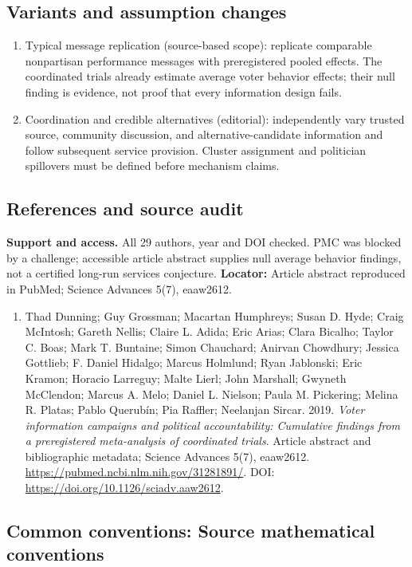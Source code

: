\documentclass[11pt,a4paper]{article}
\begin{document}
\subsection*{Variants and assumption changes}
\begin{enumerate}
\item Typical message replication (source-based scope): replicate comparable nonpartisan performance messages with preregistered pooled effects. The coordinated trials already estimate average voter behavior effects; their null finding is evidence, not proof that every information design fails.
\item Coordination and credible alternatives (editorial): independently vary trusted source, community discussion, and alternative-candidate information and follow subsequent service provision. Cluster assignment and politician spillovers must be defined before mechanism claims.
\end{enumerate}
\subsection*{References and source audit}
\textbf{Support and access.} All 29 authors, year and DOI checked. PMC was blocked by a challenge; accessible article abstract supplies null average behavior findings, not a certified long-run services conjecture. \textbf{Locator:} Article abstract reproduced in PubMed; Science Advances 5(7), eaaw2612.
\begin{enumerate}\raggedright
\item\hypertarget{definitions:source:30007669:1}{} Thad Dunning; Guy Grossman; Macartan Humphreys; Susan D. Hyde; Craig McIntosh; Gareth Nellis; Claire L. Adida; Eric Arias; Clara Bicalho; Taylor C. Boas; Mark T. Buntaine; Simon Chauchard; Anirvan Chowdhury; Jessica Gottlieb; F. Daniel Hidalgo; Marcus Holmlund; Ryan Jablonski; Eric Kramon; Horacio Larreguy; Malte Lierl; John Marshall; Gwyneth McClendon; Marcus A. Melo; Daniel L. Nielson; Paula M. Pickering; Melina R. Platas; Pablo Querubín; Pia Raffler; Neelanjan Sircar. 2019. \emph{Voter information campaigns and political accountability: Cumulative findings from a preregistered meta-analysis of coordinated trials}. Article abstract and bibliographic metadata; Science Advances 5(7), eaaw2612.
\url{https://pubmed.ncbi.nlm.nih.gov/31281891/}.
DOI: \url{https://doi.org/10.1126/sciadv.aaw2612}.
\end{enumerate}

\subsection*{Common conventions: Source mathematical conventions}
\end{document}
